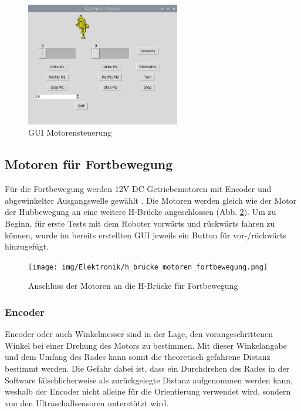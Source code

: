 \begin{figure}[H]
  \includegraphics[width=0.6\textwidth]{img/Elektronik/gui_motoren.png}
  \centering
  \caption{GUI Motorensteuerung}
  \label{fig:gui-motoren}
\end{figure}

\newpage

\subsection{Motoren für Fortbewegung}
Für die Fortbewegung werden 12V DC Getriebemotoren mit Encoder und abgewinkelter Ausgangswelle gewählt \cite{Motoren-Fortbewegung}. Die Motoren werden gleich wie der Motor der Hubbewegung an eine weitere H-Brücke angeschlossen (Abb. \ref{fig:hbrücke-fortbeweg}).
Um zu Beginn, für erste Tests mit dem Roboter vorwärts und rückwärts fahren zu können, wurde im bereits erstellten GUI jeweils ein Button für vor-/rückwärts hinzugefügt.

\begin{figure}[H]
  \texttt{[image: img/Elektronik/h\_brücke\_motoren\_fortbewegung.png]}
  \centering
  \caption{Anschluss der Motoren an die H-Brücke für Fortbewegung}
  \label{fig:hbrücke-fortbeweg}
\end{figure}

\subsubsection{Encoder}
Encoder oder auch Winkelmesser sind in der Lage, den vorangeschrittenen Winkel bei einer Drehung des Motors zu bestimmen. Mit dieser Winkelangabe und dem Umfang des Rades kann somit die theoretisch gefahrene Distanz bestimmt werden. Die Gefahr dabei ist, dass ein Durchdrehen des Rades in der Software fälschlicherweise als zurückgelegte Distanz aufgenommen werden kann, weshalb der Encoder nicht alleine für die Orientierung verwendet wird, sondern von den Ultraschallsensoren unterstützt wird.

